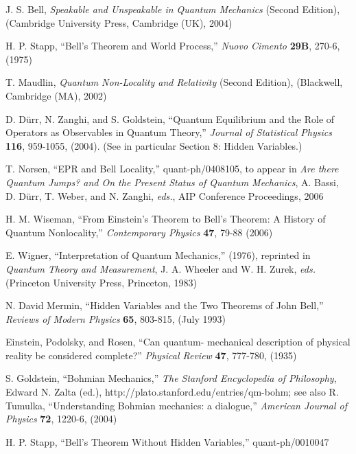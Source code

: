 \documentclass[aps,prc,onecolumn,12pt,nofootinbib]{revtex4-2}
\begin{document}
\begin{thebibliography}{00}
\raggedright
{}
J. S. Bell, \emph{Speakable and Unspeakable in Quantum Mechanics}
(Second Edition), (Cambridge University Press, Cambridge (UK), 2004)

H. P. Stapp, ``Bell's Theorem and World Process,'' \emph{Nuovo
  Cimento} {\bf{29B}}, 270-6, (1975)

  T. Maudlin, \emph{Quantum Non-Locality and
    Relativity} (Second Edition), (Blackwell, Cambridge (MA), 2002)

  D. D\"urr, N. Zanghi, and S. Goldstein, ``Quantum
  Equilibrium and the Role of Operators as Observables in Quantum
Theory,'' \emph{Journal of Statistical Physics} {\bf{116}}, 959-1055,
  (2004).  (See in particular Section 8:  Hidden Variables.)

  T. Norsen, ``EPR and Bell Locality,''
  quant-ph/0408105, to appear in \emph{Are there Quantum Jumps? and On
  the Present Status of Quantum Mechanics}, A. Bassi, D. D\"urr,
  T. Weber, and N. Zanghi, \emph{eds.}, AIP Conference Proceedings, 2006

  H. M. Wiseman, ``From Einstein's Theorem to Bell's
Theorem:  A History of Quantum Nonlocality,'' \emph{Contemporary
  Physics} {\bf{47}}, 79-88 (2006)

  E. Wigner, ``Interpretation of
  Quantum Mechanics,'' (1976), reprinted in \emph{Quantum Theory and
  Measurement}, J. A. Wheeler and W. H. Zurek, \emph{eds.}
  (Princeton University Press, Princeton, 1983)

  N. David Mermin, ``Hidden
  Variables and the Two Theorems of John Bell,'' \emph{Reviews of Modern
  Physics} {\bf{65}}, 803-815, (July 1993)

  Einstein, Podolsky, and Rosen, ``Can quantum-
  mechanical description of physical reality be considered
  complete?'' \emph{Physical Review} {\bf{47}}, 777-780, (1935)

  S. Goldstein, ``Bohmian Mechanics,'' \emph{The
    Stanford Encyclopedia of Philosophy}, Edward
    N. Zalta (ed.), http://plato.stanford.edu/entries/qm-bohm; see
    also R. Tumulka, ``Understanding Bohmian mechanics: a dialogue,''
    \emph{American Journal of Physics} {\bf{72}}, 1220-6, (2004)

  H. P. Stapp, ``Bell's Theorem Without Hidden
  Variables,'' quant-ph/0010047


\end{thebibliography}
\end{document}
